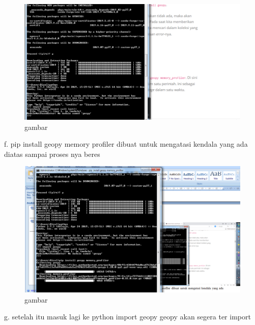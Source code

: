 \begin{enumerate}
\begin{figure}
\begin{center} 
\includegraphics[scale=0.4]{src/soal5phyton4.PNG} 
\caption{gambar} 
\label{unhas} 
\end{center} 
\end{figure}

f.	pip install geopy memory profiler dibuat untuk mengatasi kendala yang ada diatas sampai proses nya beres

\begin{figure}
\begin{center} 
\includegraphics[scale=0.4]{src/soal5phyton5.PNG} 
\caption{gambar} 
\label{unhas} 
\end{center} 
\end{figure}

g.	setelah itu masuk lagi ke python import geopy geopy akan segera ter import


\end{enumerate}
